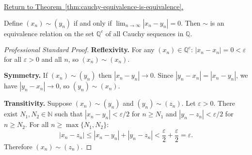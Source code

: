 
\newpage
{}
\label{prf:cauchy-equivalence-is-equivalence}

\begin{remark*}[Return]
\hyperref[thm:cauchy-equivalence-is-equivalence]{Return to Theorem~\ref*{thm:cauchy-equivalence-is-equivalence}.}
\end{remark*}

\begin{theorem*}
Define $(x_n) \sim (y_n)$ if and only if $\lim_{n\to\infty}|x_n - y_n| = 0$.
Then $\sim$ is an equivalence relation on the set $\mathbb{Q}^c$ of all
Cauchy sequences in $\mathbb{Q}$.
\end{theorem*}

\begin{proof}[Professional Standard Proof]
\LRAProofBodyStart
\textbf{Reflexivity.}
For any $(x_n) \in \mathbb{Q}^c$: $|x_n - x_n| = 0 < \varepsilon$ for all
$\varepsilon > 0$ and all $n$, so $(x_n) \sim (x_n)$.

\textbf{Symmetry.}
If $(x_n) \sim (y_n)$ then $|x_n - y_n| \to 0$.
Since $|y_n - x_n| = |x_n - y_n|$, we have $|y_n - x_n| \to 0$, so
$(y_n) \sim (x_n)$.

\textbf{Transitivity.}
Suppose $(x_n) \sim (y_n)$ and $(y_n) \sim (z_n)$.
Let $\varepsilon > 0$.  There exist $N_1, N_2 \in \mathbb{N}$ such that
$|x_n - y_n| < \varepsilon/2$ for $n \geq N_1$ and
$|y_n - z_n| < \varepsilon/2$ for $n \geq N_2$.
For all $n \geq \max\{N_1, N_2\}$:
\[
|x_n - z_n|
\leq |x_n - y_n| + |y_n - z_n|
< \frac{\varepsilon}{2} + \frac{\varepsilon}{2} = \varepsilon.
\]
Therefore $(x_n) \sim (z_n)$.
\end{proof}

